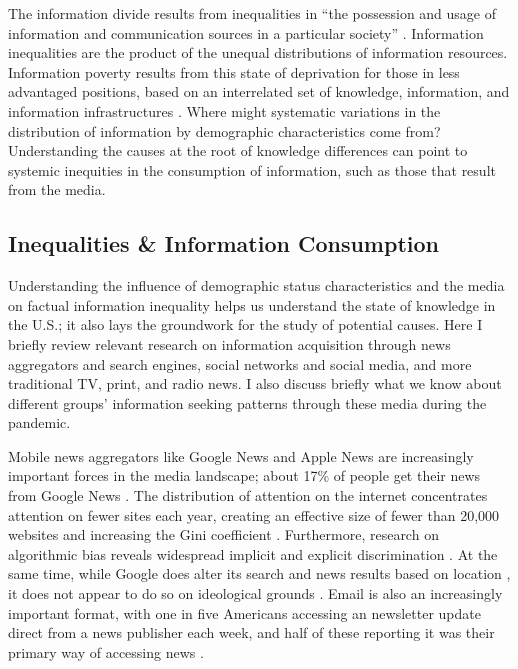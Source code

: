 \documentclass[11pt]{article}
\begin{document}
The information divide results from inequalities in ``the possession and usage of information and communication sources in a particular society'' \citep[231]{Yu2006}. Information inequalities are the product of the unequal distributions of information resources. Information poverty results from this state of deprivation for those in less advantaged positions, based on an interrelated set of knowledge, information, and information infrastructures \citep{Britz2004}. Where might systematic variations in the distribution of information by demographic characteristics come from? Understanding the causes at the root of knowledge differences can point to systemic inequities in the consumption of information, such as those that result from the media.


\subsection{Inequalities \& Information Consumption}

Understanding the influence of demographic status characteristics and the media on factual information inequality helps us understand the state of knowledge in the U.S.; it also lays the groundwork for the study of potential causes. Here I briefly review relevant research on information acquisition through news aggregators and search engines, social networks and social media, and more traditional TV, print, and radio news. I also discuss briefly what we know about different groups' information seeking patterns through these media during the pandemic.

Mobile news aggregators like Google News and Apple News are increasingly important forces in the media landscape; about 17\% of people get their news from Google News \citep{Reuters2020}. The distribution of attention on the internet concentrates attention on fewer sites each year, creating an effective size of fewer than 20,000 websites and increasing the Gini coefficient \citep{McCurley2007}. Furthermore, research on algorithmic bias reveals widespread implicit and explicit discrimination \citep{Sweeney2013,ONeil2016,Eubanks2018,Noble2018}. At the same time, while Google does alter its search and news results based on location \citep{KlimanSilver2015,Fischer2020}, it does not appear to do so on ideological grounds \citep{Haim2018}. Email is also an increasingly important format, with one in five Americans accessing an newsletter update direct from a news publisher each week, and half of these reporting it was their primary way of accessing news \citep{Reuters2020}.
\end{document}
